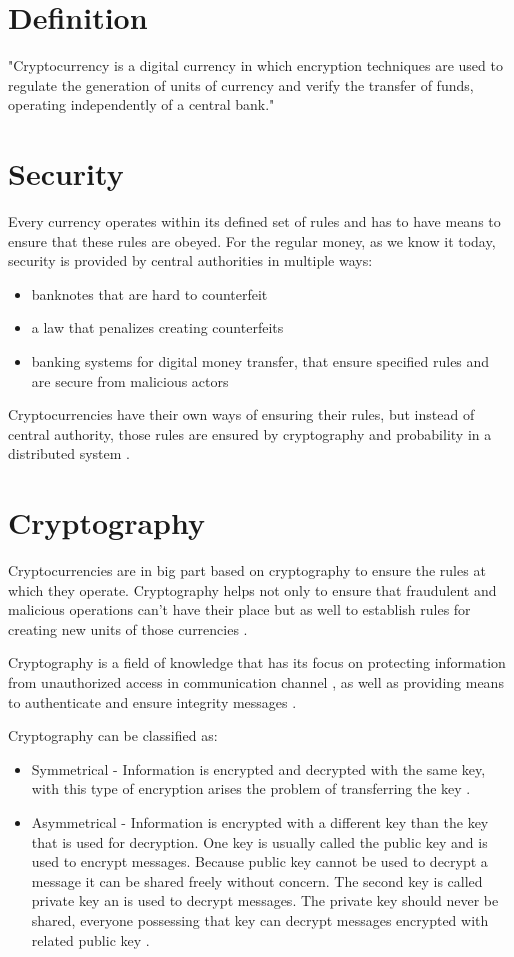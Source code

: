 \documentclass[12pt, en, eng, oneside, final]{mgr}
\begin{document}
\section{Definition}
"Cryptocurrency is a digital currency in which encryption techniques are used to regulate the generation of units of currency and verify the transfer of funds, operating independently of a central bank." \cite{crypto-def}

\section{Security}
Every currency operates within its defined set of rules and has to have means to ensure that these rules are obeyed. For the regular money, as we know it today, security is provided by central authorities in multiple ways:
\begin{itemize}
\item
banknotes that are hard to counterfeit
\item
a law that penalizes creating counterfeits
\item
banking systems for digital money transfer, that ensure specified rules and are secure from malicious actors
\end{itemize}

Cryptocurrencies have their own ways of ensuring their rules, but instead of central authority, those rules are ensured by cryptography and probability in a distributed system \cite{bartek}.

\section{Cryptography}
Cryptocurrencies are in big part based on cryptography to ensure the rules at which they operate. Cryptography helps not only to ensure that fraudulent and malicious operations can't have their place but as well to establish rules for creating new units of those currencies \cite{cryptocurrencies}. 

Cryptography is a field of knowledge that has its focus on protecting information from unauthorized access in communication channel \cite{cryptography}, as well as providing means to authenticate and ensure integrity messages \cite{cryptography-2}. 

Cryptography can be classified as:

\begin{itemize}
\item
Symmetrical - Information is encrypted and decrypted with the same key, with this type of encryption arises the problem of transferring the key \cite{bartek}.
\item
Asymmetrical - Information is encrypted with a different key than the key that is used for decryption. One key is usually called the public key and is used to encrypt messages. Because public key cannot be used to decrypt a message it can be shared freely without concern. The second key is called private key an is used to decrypt messages. The private key should never be shared, everyone possessing that key can decrypt messages encrypted with related public key \cite{bartek}.
\end{itemize} 
\end{document}
